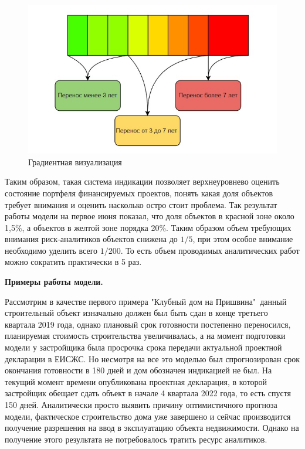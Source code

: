 \documentclass[12pt,a4paper]{article} %
\begin{document}
\begin{figure}[h]
	
	\centering
	
	\includegraphics[width=0.8\linewidth]{indication.jpg}
	
	\caption{Градиентная визуализация}
	
	\label{fig:indication}
	
\end{figure} 

Таким образом, такая система индикации позволяет верхнеуровнево оценить состояние портфеля финансируемых проектов, понять какая доля объектов требует внимания и оценить насколько остро стоит проблема. Так результат работы модели на первое июня показал, что доля объектов в красной зоне около 1,5\%, а объектов в желтой зоне порядка 20\%. Таким образом объем требующих внимания риск-аналитиков объектов снижена до $1/5$, при этом особое внимание необходимо уделить всего $1/200$. То есть объем проводимых аналитических работ можно сократить практически в 5 раз.


\textbf{Примеры работы модели.}

Рассмотрим в качестве первого примера "Клубный дом на Пришвина"\ данный строительный объект изначально должен был быть сдан в конце третьего квартала 2019 года, однако плановый срок готовности постепенно переносился, планируемая стоимость строительства увеличивалась, а на момент подготовки модели у застройщика была просрочка срока передачи актуальной проектной декларации в ЕИСЖС. Но несмотря на все это моделью был спрогнозирован срок окончания готовности в 180 дней и дом обозначен индикацией не был. На текущий момент времени опубликована проектная декларация, в которой застройщик обещает сдать объект в начале 4 квартала 2022 года, то есть спустя 150 дней. Аналитически просто выявить причину оптимистичного прогноза модели, фактическое строительство дома уже завершено и сейчас производится получение разрешения на ввод в эксплуатацию объекта недвижимости. Однако на получение этого результата не потребовалось тратить ресурс аналитиков.
\end{document}
